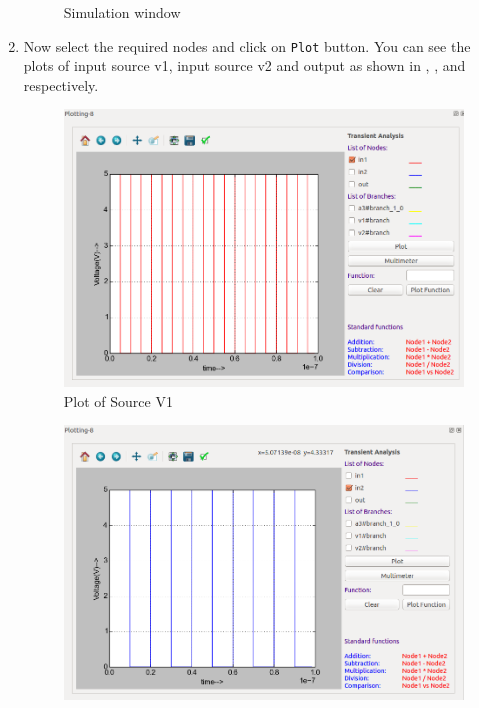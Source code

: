 \begin{enumerate}
\begin{figure}[!htp]
                        \caption{Simulation window}
                        \label{screen19}
                    \end{figure}
\pagebreak 
\item Now select the required nodes and click on \texttt {Plot} button. You can see the plots of input source v1, input source v2 and output as shown in , , and  respectively.
\begin{figure}[!htp]
                        \centering
                        \includegraphics[width =\lgfig]{./NGHDL/plotv1.png}
                        \caption{Plot of Source V1}
                        \label{plotv1}
                    \end{figure}
\begin{figure}[!htp]
                        \centering
                        \includegraphics[width =\lgfig]{./NGHDL/plotv2.png}

\end{figure}
\end{enumerate}
